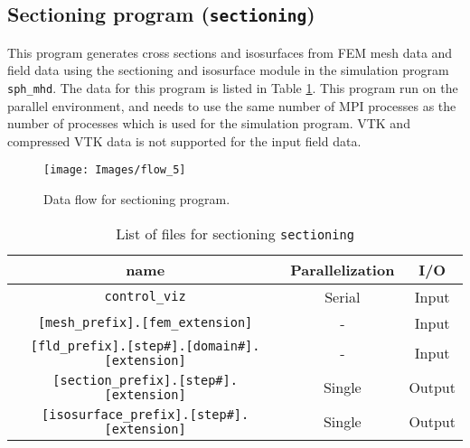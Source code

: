 \subsection{Sectioning program ({\tt sectioning})} \label{sec:sectioning}
This program generates cross sections and isosurfaces from FEM mesh data and field data using the sectioning and isosurface module in the simulation program {\tt sph\_mhd}. The data for this program is listed in Table \ref{table:sectioning}. This program run on the parallel environment, and needs to use the same number of MPI processes as the number of processes which is used for the simulation program. VTK and compressed VTK data is not supported for the input field data.
%
\begin{figure}[htbp]
\begin{center}
\texttt{[image: Images/flow\_5]}
\end{center}
\caption{Data flow for sectioning program.}
\label{fig:flow_add_ini}
\end{figure}
%
\begin{table}[htp]
\caption{List of files for sectioning {\tt sectioning} }
\begin{center} 
\begin{tabular}{|c|c|c|}
\hline
name & Parallelization & I/O \\ \hline \hline
\verb|control_viz| & Serial & Input \\ \hline
\verb|[mesh_prefix].[fem_extension]| & - & Input \\ \hline
\verb|[fld_prefix].[step#].[domain#].[extension]| & - & Input  \\ \hline
\verb|[section_prefix].[step#].[extension]| &  Single & Output  \\
\verb|[isosurface_prefix].[step#].[extension]| &  Single & Output  \\ \hline
\end{tabular}
\end{center}
\label{table:sectioning}
\end{table}
%

